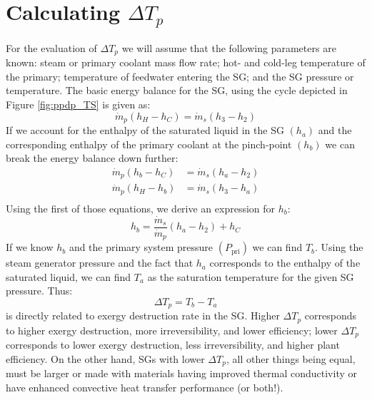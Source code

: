 \section{Calculating $\Delta T_{p}$}
For the evaluation of $\Delta T_{p}$ we will assume that the following parameters are known: steam or primary coolant mass flow rate; hot- and cold-leg temperature of the primary; temperature of feedwater entering the SG; and the SG pressure or temperature.  The basic energy balance for the SG, using the cycle depicted in Figure \ref{fig:ppdp_TS} is given as:
$$ \dot{m}_p (h_H - h_C) = \dot{m}_s (h_3 - h_2) $$
If we account for the enthalpy of the saturated liquid in the SG $(h_a)$ and the corresponding enthalpy of the primary coolant at the pinch-point $(h_b)$ we can break the energy balance down further:
\begin{align*}
\dot{m}_p(h_b - h_C) &= \dot{m}_s (h_a - h_2) \\
\dot{m}_p(h_H - h_b) &= \dot{m}_s (h_3 - h_a) \\
\end{align*}
Using the first of those equations, we derive an expression for $h_b$:
$$ h_b = \frac{\dot{m}_s}{\dot{m}_p}(h_a - h_2) + h_C$$
If we know $h_b$ and the primary system pressure $(P_{\text{pri}})$ we can find $T_b$.  Using the steam generator pressure and the fact that $h_a$ corresponds to the enthalpy of the saturated liquid, we can find $T_a$ as the saturation temperature for the given SG pressure. Thus:
$$\Delta T_{p} = T_b - T_a$$
 is directly related to exergy destruction rate in the SG.  Higher $\Delta T_p$ corresponds to higher exergy destruction, more irreversibility, and lower efficiency; lower $\Delta T_p$ corresponds to lower exergy destruction, less irreversibility, and higher plant efficiency.  On the other hand, SGs with lower $\Delta T_p$, all other things being equal, must be larger or made with materials having improved thermal conductivity or have enhanced convective heat transfer performance (or both!).

